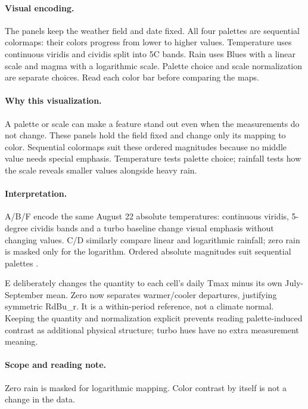 \documentclass[conference,a4paper]{IEEEtran}
\begin{document}
\paragraph{Visual encoding.} The panels keep the weather field and date fixed. All four palettes are sequential colormaps: their colors progress from lower to higher values. Temperature uses continuous viridis and cividis split into 5\textdegree{}C bands. Rain uses Blues with a linear scale and magma with a logarithmic scale. Palette choice and scale normalization are separate choices. Read each color bar before comparing the maps.



\paragraph{Why this visualization.} A palette or scale can make a feature stand out even when the measurements do not change. These panels hold the field fixed and change only its mapping to color. Sequential colormaps suit these ordered magnitudes because no middle value needs special emphasis. Temperature tests palette choice; rainfall tests how the scale reveals smaller values alongside heavy rain.



\paragraph{Interpretation.} A/B/F encode the same August 22 absolute temperatures: continuous viridis, 5-degree cividis bands and a turbo baseline change visual emphasis without changing values. C/D similarly compare linear and logarithmic rainfall; zero rain is masked only for the logarithm. Ordered absolute magnitudes suit sequential palettes \cite{ref7}.

E deliberately changes the quantity to each cell's daily Tmax minus its own July-September mean. Zero now separates warmer/cooler departures, justifying symmetric RdBu\_r. It is a within-period reference, not a climate normal. Keeping the quantity and normalization explicit prevents reading palette-induced contrast as additional physical structure; turbo hues have no extra measurement meaning.



\paragraph{Scope and reading note.} Zero rain is masked for logarithmic mapping. Color contrast by itself is not a change in the data.
\end{document}
